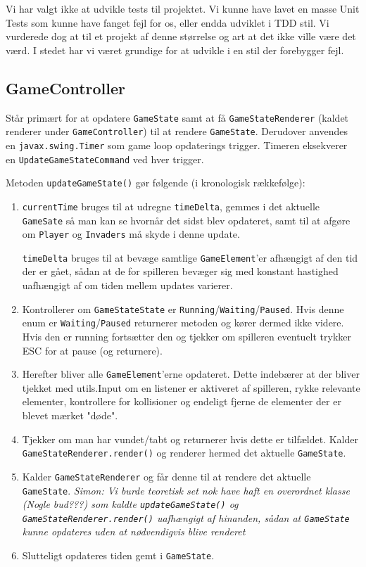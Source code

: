 \documentclass[titlepage,danish]{article}
\newcommand{\code}[1]{\texttt{#1}}
\begin{document}
Vi har valgt ikke at udvikle tests til projektet. Vi kunne have lavet en masse Unit Tests som kunne
have fanget fejl for os, eller endda udviklet i TDD stil. Vi vurderede dog at til et projekt af
denne størrelse og art at det ikke ville være det værd. I stedet har vi været grundige for at
udvikle i en stil der forebygger fejl.

\subsection{GameController}
Står primært for at opdatere \code{GameState} samt at få \code{GameStateRenderer} (kaldet renderer
under \code{GameController}) til at rendere \code{GameState}. Derudover anvendes en
\code{javax.swing.Timer} som game loop opdaterings trigger. Timeren eksekverer en
\code{UpdateGameStateCommand} ved hver trigger.

Metoden \code{updateGameState()} gør følgende (i kronologisk rækkefølge):
\begin{enumerate}

\item \code{currentTime} bruges til at udregne \code{timeDelta}, gemmes i det aktuelle
  \code{GameSate} så man kan se hvornår det sidst blev opdateret, samt til at afgøre om
  \code{Player} og \code{Invaders} må skyde i denne update.

\code{timeDelta} bruges til at bevæge samtlige \code{GameElement}’er afhængigt af den tid der er gået, sådan at de for spilleren bevæger sig med konstant hastighed uafhængigt af om tiden mellem updates varierer.

\item Kontrollerer om \code{GameStateState} er \code{Running}/\code{Waiting}/\code{Paused}. Hvis denne enum er \code{Waiting}/\code{Paused} returnerer metoden og kører dermed ikke videre. Hvis den er running fortsætter den og tjekker om spilleren eventuelt trykker ESC for at pause (og returnere).

\item Herefter bliver alle \code{GameElement}’erne opdateret. Dette indebærer at der bliver tjekket med utils.Input om en listener er aktiveret af spilleren, rykke relevante elementer, kontrollere for kollisioner og endeligt fjerne de elementer der er blevet mærket "døde".

\item Tjekker om man har vundet/tabt og returnerer hvis dette er tilfældet. Kalder \code{GameStateRenderer.render()} og renderer hermed det aktuelle \code{GameState}.

\item Kalder \code{GameStateRenderer} og får denne til at rendere det aktuelle \code{GameState}. \emph{Simon: Vi burde teoretisk set nok have haft en overordnet klasse (Nogle bud???) som kaldte \code{updateGameState()} og \code{GameStateRenderer.render()} uafhængigt af hinanden, sådan at \code{GameState} kunne opdateres uden at nødvendigvis blive renderet}

\item Slutteligt opdateres tiden gemt i \code{GameState}.
\end{enumerate}
\end{document}

